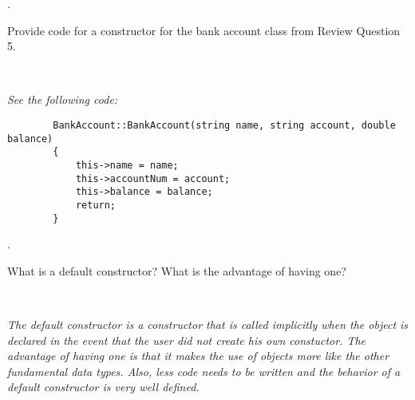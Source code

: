 \documentclass{amsart}
\begin{document}
. 
\begin{minipage}[t]{11.5 cm}
	Provide code for a constructor for the bank account class from Review Question 5.
\end{minipage} \\[1ex]
\phantom{2. } 
\begin{minipage}[t]{11.5 cm}
	{\slshape 
	See the following code:
	}
	\begin{verbatim}
		BankAccount::BankAccount(string name, string account, double balance)
		{
		    this->name = name; 
		    this->accountNum = account;
		    this->balance = balance;
		    return;
		}
	\end{verbatim}
\end{minipage} 
\vfill
\newpage

\phantom{\quad} \vfill
{}. 
\begin{minipage}[t]{11.5 cm}
	What is a default constructor? What is the advantage of having one?
\end{minipage} \\[1ex]
\phantom{3. } 
\begin{minipage}[t]{11.5 cm}
	{\slshape 
	The default constructor is a constructor that is called 
	implicitly when the object is declared in the event that
	the user did not create his own constuctor.
	The advantage of having one is that it makes the use of
	objects more like the other fundamental data types. 
	Also, less code needs to be written and the behavior
	of a default constructor is very well defined.
	} 
\end{minipage} 
\vfill
\end{document}
